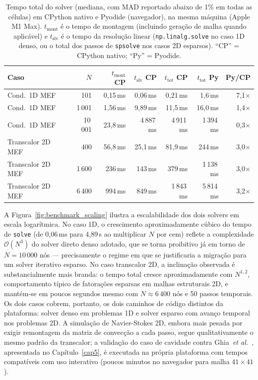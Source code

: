 \begin{table}[H]
\centering
\caption{Tempo total do solver (mediana, com MAD reportado abaixo de 1\% em todas as células) em CPython nativo e Pyodide (navegador), na mesma máquina (Apple M1 Max). $t_{\text{mont}}$ é o tempo de montagem (incluindo geração de malha quando aplicável) e $t_{\text{slv}}$ é o tempo da resolução linear (\texttt{np.linalg.solve} no caso 1D denso, ou o total dos passos de \texttt{spsolve} nos casos 2D esparsos). ``CP'' = CPython nativo; ``Py'' = Pyodide.}
\label{tab:benchmark_runtimes}
\small
\setlength{\tabcolsep}{4pt}
\begin{tabular}{lrrrrrr}
\hline
\textbf{Caso} & \textbf{$N$} & \textbf{$t_{\text{mont}}$ CP} & \textbf{$t_{\text{slv}}$ CP} & \textbf{$t_{\text{tot}}$ CP} & \textbf{$t_{\text{tot}}$ Py} & \textbf{Py/CP} \\
\hline
Cond.~1D MEF        & 101     & 0,15\,ms    & 0,06\,ms    & 0,21\,ms    & 1,6\,ms      & 7,1$\times$ \\
Cond.~1D MEF        & 1\,001  & 1,56\,ms    & 9,89\,ms    & 11,5\,ms    & 16,0\,ms     & 1,4$\times$ \\
Cond.~1D MEF        & 10\,001 & 23,8\,ms    & 4\,887\,ms  & 4\,911\,ms  & 1\,394\,ms   & 0,3$\times$ \\
\hline
Transcalor 2D MEF   & 400     & 56,8\,ms    & 25,1\,ms    & 81,9\,ms    & 244\,ms      & 3,0$\times$ \\
Transcalor 2D MEF   & 1\,600  & 236\,ms     & 143\,ms     & 379\,ms     & 1\,138\,ms   & 3,0$\times$ \\
Transcalor 2D MEF   & 6\,400  & 994\,ms     & 849\,ms     & 1\,843\,ms  & 5\,814\,ms   & 3,2$\times$ \\
\hline
\end{tabular}
\end{table}

A Figura~\ref{fig:benchmark_scaling} ilustra a escalabilidade dos dois solvers em escala logarítmica. No caso 1D, o crescimento aproximadamente cúbico do tempo de \texttt{solve} (de 0,06\,ms para 4,89\,s ao multiplicar $N$ por cem) reflete a complexidade $\mathcal{O}(N^3)$ do solver direto denso adotado, que se torna proibitivo já em torno de $N = 10\,000$ nós --- precisamente o regime em que se justificaria a migração para um solver iterativo esparso. No caso transcalor 2D, a inclinação observada é substancialmente mais branda: o tempo total cresce aproximadamente com $N^{1{,}2}$, comportamento típico de fatorações esparsas em malhas estruturais 2D, e mantém-se em poucos segundos mesmo com $N \approx 6\,400$ nós e 50 passos temporais. Os dois casos cobrem, portanto, os dois caminhos de código distintos da plataforma: solver denso em problemas 1D e solver esparso com avanço temporal nos problemas 2D. A simulação de Navier-Stokes 2D, embora mais pesada por exigir remontagem da matriz de convecção a cada passo, segue qualitativamente o mesmo padrão da transcalor; a validação do caso de cavidade contra Ghia~\textit{et al.}~\cite{Ghia1982}, apresentada no Capítulo~\ref{cap5}, é executada na própria plataforma com tempos compatíveis com uso interativo (poucos minutos no navegador para malha $41 \times 41$).

